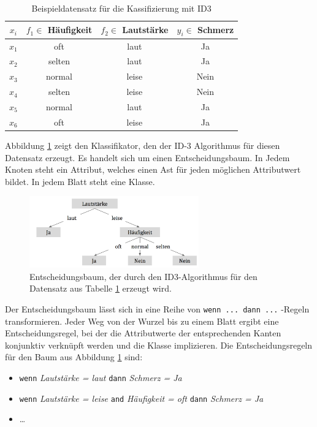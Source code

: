 \begin{table}[h]
	\centering
	\caption{Beispieldatensatz für die Kassifizierung mit ID3}
	\label{tab:id3_example}
	\begin{tabular}{cccc}
		\toprule
		$x_i$    & $f_1 \in $ Häufigkeit   & $f_2 \in $ Lautstärke & $y_i \in $ Schmerz \\\midrule
		$x_1$  & oft                & laut          & Ja           \\
		$x_2$  & selten                & laut          & Ja           \\
		$x_3$  & normal                & leise          & Nein         \\
		$x_4$  & selten                & leise          & Nein           \\
		$x_5$  & normal                & laut         & Ja       \\
		$x_6$  & oft                & leise          & Ja       \\ \bottomrule  
	\end{tabular}
\end{table}

Abbildung \ref{img:id3tree} zeigt den Klassifikator, den der ID-3 Algorithmus für diesen Datensatz erzeugt. Es handelt sich um einen Entscheidungsbaum. In Jedem Knoten steht ein Attribut, welches einen Ast für jeden möglichen Attributwert bildet. In jedem Blatt steht eine Klasse.\cite[S. 134]{machine_marsland}

\begin{figure}[h]
	\centering
	\includegraphics[width=0.65\textwidth]{bilder/id3tree02.png}
	\caption[Beispiel für einen Entscheidungsbaum]{Entscheidungsbaum, der durch den ID3-Algorithmus für den Datensatz aus Tabelle \ref{tab:id3_example} erzeugt wird.}
	\label{img:id3tree}
\end{figure}

Der Entscheidungsbaum lässt sich in eine Reihe von \texttt{wenn ... dann ...} -Regeln transformieren. Jeder Weg von der Wurzel bis zu einem Blatt ergibt eine Entscheidungsregel, bei der die Attributwerte der entsprechenden Kanten konjunktiv verknüpft werden und die Klasse implizieren.\cite[S. 134]{machine_marsland} Die Entscheidungsregeln für den Baum aus Abbildung 	\ref{img:id3tree} sind:
\begin{itemize}
	\item \texttt{wenn}  \emph{Lautstärke = laut} \texttt{dann} \emph{Schmerz = Ja}
	\item \texttt{wenn}  \emph{Lautstärke = leise} \texttt{and} \emph{Häufigkeit = oft} \texttt{dann} \emph{Schmerz = Ja}
	\item \ldots
\end{itemize}

